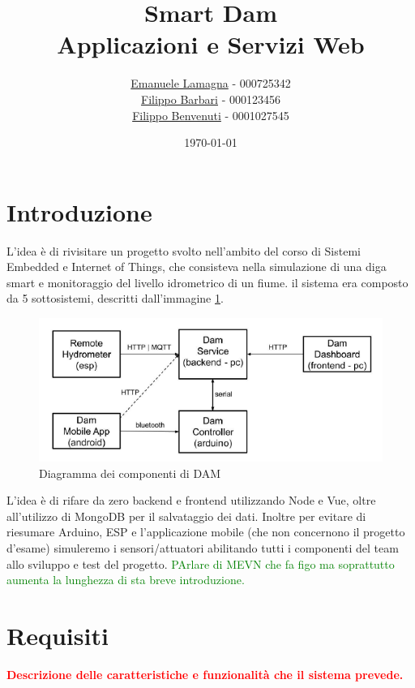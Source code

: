 \documentclass{article}
\title{
    Smart Dam \\
    \large Applicazioni e Servizi Web
}
\author{\href{mailto:emalama@studio.unibo.it}{Emanuele Lamagna} - 000725342\\\href{mailto:filippo.barbari@studio.unibo.it}{Filippo Barbari} - 000123456\\\href{mailto:filippo.benvenuti3@studio.unibo.it}{Filippo Benvenuti} - 0001027545}
\date{\today}
\begin{document}
\maketitle
\section*{Introduzione}\label{sec:intro}
L'idea è di rivisitare un progetto svolto nell'ambito del corso di Sistemi Embedded e Internet of Things, che consisteva nella simulazione di una diga smart e monitoraggio del livello idrometrico di un fiume. il sistema era composto da 5 sottosistemi, descritti dall'immagine \ref{fig:dam-scheme}.
\begin{figure}[h!]
	\centering
	\includegraphics[scale=0.7]{dam-scheme.png}
	\caption{Diagramma dei componenti di DAM}
	\label{fig:dam-scheme}
\end{figure}
L'idea è di rifare da zero backend e frontend utilizzando Node e Vue, oltre all'utilizzo di MongoDB per il salvataggio dei dati. Inoltre per evitare di riesumare Arduino, ESP e l'applicazione mobile (che non concernono il progetto d'esame) simuleremo i sensori/attuatori abilitando tutti i componenti del team allo sviluppo e test del progetto.
\textcolor{green}{PArlare di MEVN che fa figo ma soprattutto aumenta la lunghezza di sta breve introduzione.}

\section{Requisiti}
\textcolor{red}{\textbf{Descrizione delle caratteristiche e funzionalità che il sistema prevede.}} %
\end{document}
